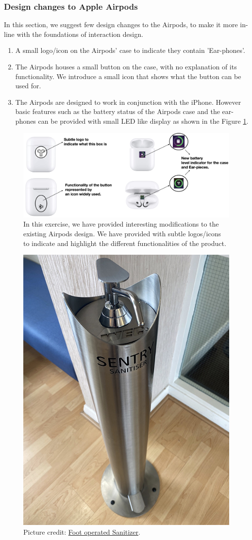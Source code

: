 \documentclass[10pt]{scrartcl}
\begin{document}
\subsubsection{Design changes to Apple Airpods}
In this section, we suggest few design changes to the Airpods, to make it more in-line with the foundations of interaction design.

\begin{enumerate}
	\item A small logo/icon on the Airpods' case to indicate they contain 'Ear-phones'.
	\item The Airpods houses a small button on the case, with no explanation of its functionality. We introduce a small icon that shows what the button can be used for.
	\item  The Airpods are designed to work in conjunction with the iPhone. However basic features such as the battery status of the Airpods case and the ear-phones can be provided with small LED like display as shown in the Figure \ref{fig:airpods}.
\end{enumerate}

\begin{figure}
	\centering
	\includegraphics[width=0.7\linewidth]{airpods}
	\caption{In this exercise, we have provided interesting modifications to the existing Airpods design. We have provided with subtle logos/icons to indicate and highlight the different functionalities of the product.}
	\label{fig:airpods}
\end{figure}

\begin{figure}
	\centering
	\includegraphics[width=0.3\linewidth]{san}
	\caption{Picture credit: \href{https://www.wec-group.com/hand-sanitiser-dispenser.html}{Foot operated Sanitizer}.}
	\label{fig:san}
\end{figure}
\end{document}
